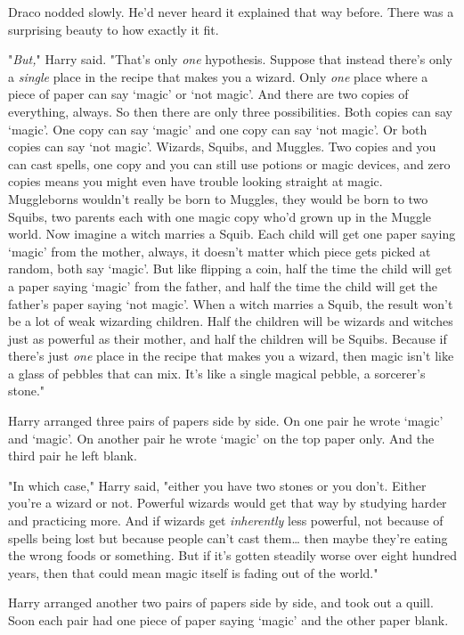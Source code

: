 Draco nodded slowly. He'd never heard it explained that way before. There was a 
surprising beauty to how exactly it fit.

"\emph{But,}" Harry said. "That's only \emph{one} hypothesis. Suppose that 
instead there's only a \emph{single} place in the recipe that makes you a 
wizard. Only \emph{one} place where a piece of paper can say `magic' or `not 
magic'. And there are two copies of everything, always. So then there are only 
three possibilities. Both copies can say `magic'. One copy can say `magic' and 
one copy can say `not magic'. Or both copies can say `not magic'. Wizards, 
Squibs, and Muggles. Two copies and you can cast spells, one copy and you can 
still use potions or magic devices, and zero copies means you might even have 
trouble looking straight at magic. Muggleborns wouldn't really be born to 
Muggles, they would be born to two Squibs, two parents each with one magic copy 
who'd grown up in the Muggle world. Now imagine a witch marries a Squib. Each 
child will get one paper saying `magic' from the mother, always, it doesn't 
matter which piece gets picked at random, both say `magic'. But like flipping a 
coin, half the time the child will get a paper saying `magic' from the father, 
and half the time the child will get the father's paper saying `not magic'. 
When a witch marries a Squib, the result won't be a lot of weak wizarding 
children. Half the children will be wizards and witches just as powerful as 
their mother, and half the children will be Squibs. Because if there's just 
\emph{one} place in the recipe that makes you a wizard, then magic isn't like a 
glass of pebbles that can mix. It's like a single magical pebble, a sorcerer's 
stone."

Harry arranged three pairs of papers side by side. On one pair he wrote `magic' 
and `magic'. On another pair he wrote `magic' on the top paper only. And the 
third pair he left blank.

"In which case," Harry said, "either you have two stones or you don't. Either 
you're a wizard or not. Powerful wizards would get that way by studying harder 
and practicing more. And if wizards get \emph{inherently} less powerful, not 
because of spells being lost but because people can't cast them{\ldots} then 
maybe they're eating the wrong foods or something. But if it's gotten steadily 
worse over eight hundred years, then that could mean magic itself is fading out 
of the world."

Harry arranged another two pairs of papers side by side, and took out a quill. 
Soon each pair had one piece of paper saying `magic' and the other paper blank.

